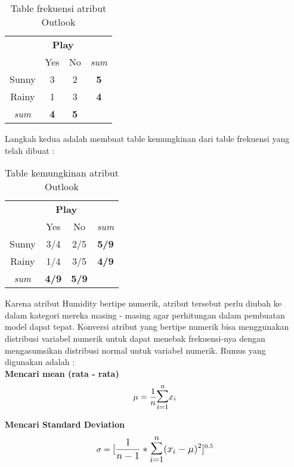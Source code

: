 		\begin{table}[ht]
			\centering
			\caption{Table frekuensi atribut Outlook}
			\begin{tabular}{|c|c|c|c|}
			\hline
			 & \multicolumn{2}{c}{\textbf{Play}} & \\
			 & Yes & No & \textit{sum} \\ 
			\hline
			Sunny & 3 & 2 & \textbf{5}\\
			\hline
			Rainy & 1 & 3 & \textbf{4} \\
			\hline
			\textit{sum} & \textbf{4} & \textbf{5} & \\
			\hline
			\end{tabular}
		\end{table}
		
		
		Langkah kedua adalah membuat table kemungkinan dari table frekuensi yang telah dibuat :		
		\begin{table}[ht]
			\centering
			\caption{Table kemungkinan atribut Outlook}
			\begin{tabular}{|c|c|c|c|}
			\toprule
			 & \multicolumn{2}{c}{\textbf{Play}} & \\
			 & Yes & No & \textit{sum} \\ 
			\midrule
			Sunny & 3/4 & 2/5 & \textbf{5/9}\\
			\midrule
			Rainy & 1/4 & 3/5 & \textbf{4/9} \\
			\midrule
			\textit{sum} & \textbf{4/9} & \textbf{5/9} & \\
			\bottomrule
			\end{tabular}
		\end{table}
		
		Karena atribut Humidity bertipe numerik, atribut tersebut perlu diubah ke dalam kategori mereka masing - masing agar perhitungan dalam pembuatan model dapat tepat. Konversi atribut yang bertipe numerik bisa menggunakan distribusi variabel numerik untuk dapat menebak frekuensi-nya dengan mengasumsikan distribusi normal untuk variabel numerik. Rumus yang digunakan adalah :\\
		
		\textbf{Mencari mean (rata - rata)} 
		\begin{equation}
			\mu = \dfrac{1}{n} \mathlarger{\mathlarger{\sum}}_{i=1}^{n}x_i
		\end{equation}
		
		\textbf{Mencari Standard Deviation}
		\begin{equation}
			\sigma = \mathlarger{[ \dfrac{1}{n - 1} * \mathlarger{\mathlarger{\sum}}_{i=1}^{n} (x_i - \mu)^2]}^{0.5}
		\end{equation}
		
